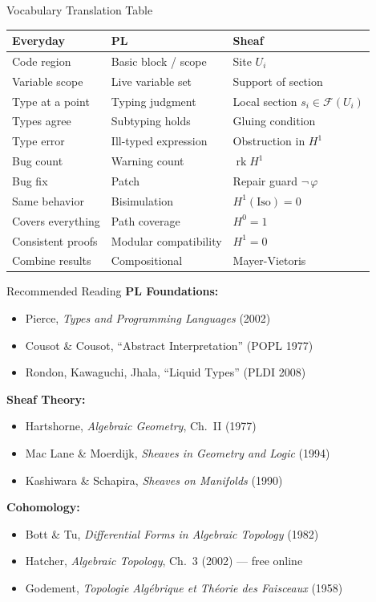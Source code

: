 \documentclass[aspectratio=169,10pt]{beamer}
\newcommand{\Fscr}{\mathcal{F}}
\newcommand{\Iso}{\mathrm{Iso}}
\newcommand{\rk}{\operatorname{rk}}
\begin{document}
\begin{frame}{Vocabulary Translation Table}
\footnotesize
\renewcommand{\arraystretch}{1.25}
\begin{tabular}{@{}p{3cm}p{3.5cm}p{4cm}@{}}
\toprule
\textbf{Everyday} & \textbf{PL} & \textbf{Sheaf} \\
\midrule
Code region & Basic block / scope & Site $U_i$ \\
Variable scope & Live variable set & Support of section \\
Type at a point & Typing judgment & Local section $s_i \in \Fscr(U_i)$ \\
Types agree & Subtyping holds & Gluing condition \\
Type error & Ill-typed expression & Obstruction in $H^1$ \\
Bug count & Warning count & $\rk H^1$ \\
Bug fix & Patch & Repair guard $\lnot\,\varphi$ \\
Same behavior & Bisimulation & $H^1(\Iso) = 0$ \\
Covers everything & Path coverage & $H^0 = 1$ \\
Consistent proofs & Modular compatibility & $H^1 = 0$ \\
Combine results & Compositional & Mayer-Vietoris \\
\bottomrule
\end{tabular}
\end{frame}

\begin{frame}{Recommended Reading}
\textbf{PL Foundations:}
\begin{itemize}\small
  \item Pierce, \emph{Types and Programming Languages} (2002)
  \item Cousot \& Cousot, ``Abstract Interpretation'' (POPL 1977)
  \item Rondon, Kawaguchi, Jhala, ``Liquid Types'' (PLDI 2008)
\end{itemize}

\textbf{Sheaf Theory:}
\begin{itemize}\small
  \item Hartshorne, \emph{Algebraic Geometry}, Ch.\ II (1977)
  \item Mac Lane \& Moerdijk, \emph{Sheaves in Geometry and Logic} (1994)
  \item Kashiwara \& Schapira, \emph{Sheaves on Manifolds} (1990)
\end{itemize}

\textbf{Cohomology:}
\begin{itemize}\small
  \item Bott \& Tu, \emph{Differential Forms in Algebraic Topology} (1982)
  \item Hatcher, \emph{Algebraic Topology}, Ch.\ 3 (2002) --- free online
  \item Godement, \emph{Topologie Alg\'ebrique et Th\'eorie des Faisceaux} (1958)
\end{itemize}
\end{frame}
\end{document}
